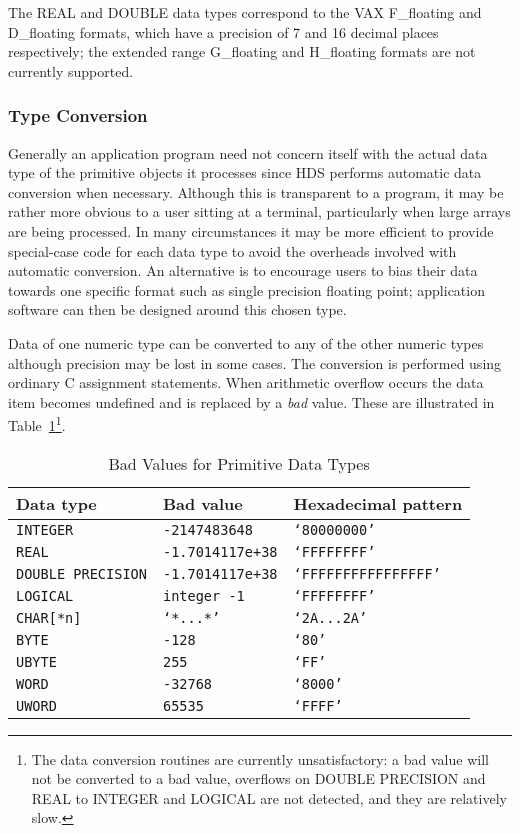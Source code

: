 The REAL and DOUBLE data types correspond to the VAX F\_floating and
D\_floating formats, which have a precision of 7 and 16 decimal places
respectively; the extended range G\_floating and H\_floating formats are
not currently supported. 

\subsubsection {Type Conversion}

Generally an application program need not concern itself with the actual data
type of the primitive objects it processes since HDS performs automatic data
conversion when necessary. Although this is transparent to a program, it may be
rather more obvious to a user sitting at a terminal, particularly when large
arrays are being processed. In many circumstances it may be more efficient to
provide special-case code for each data type to avoid the overheads involved
with automatic conversion. An alternative is to encourage users to bias their
data towards one specific format such as single precision floating point;
application software can then be designed around this chosen type. 

Data of one numeric type can be converted to any of the other numeric types
although precision may be lost in some cases. The conversion is performed using
ordinary C assignment statements. When arithmetic overflow occurs the data item
becomes undefined and is replaced by a {\em bad} value. These are illustrated
in Table~\ref{bad_values_for_primitive_data_types}\footnote{The data conversion
routines are currently unsatisfactory: a bad value will not be converted to a
bad value, overflows on DOUBLE PRECISION and REAL to INTEGER and LOGICAL are
not detected, and they are relatively slow.}.

\begin {table}[htbp]
\begin {center}
\begin {tabular}{||l|l|l||}
\hline
Data type		& Bad value		& Hexadecimal pattern \\
\hline
{\tt INTEGER}		& {\tt -2147483648}	& {\tt `80000000'} \\
{\tt REAL}		& {\tt -1.7014117e+38}	& {\tt `FFFFFFFF'} \\
{\tt DOUBLE PRECISION}	& {\tt -1.7014117e+38}	& {\tt `FFFFFFFFFFFFFFFF'} \\
{\tt LOGICAL}		& {\tt integer -1}	& {\tt `FFFFFFFF'} \\
{\tt CHAR[*n]}		& {\tt `*...*'}		& {\tt `2A...2A'} \\
{\tt BYTE}		& {\tt -128}		& {\tt `80'} \\
{\tt UBYTE}		& {\tt 255}		& {\tt `FF'} \\
{\tt WORD}		& {\tt -32768}		& {\tt `8000'} \\
{\tt UWORD}		& {\tt 65535}		& {\tt `FFFF'} \\
\hline
\end {tabular}
\caption {Bad Values for Primitive Data Types}
\label {bad_values_for_primitive_data_types}
\end {center}
\end {table}
       
